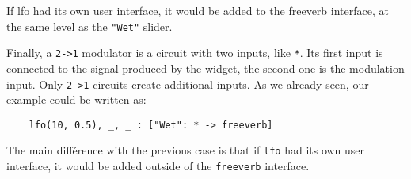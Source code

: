 If lfo had its own user interface, it would be added to the freeverb interface, at the same level as the \lstinline`"Wet"` slider. 

Finally, a \lstinline`2->1` modulator is a circuit with two inputs, like \lstinline`*`. Its first input is connected to the signal produced by the widget, the second one is the modulation input. Only \lstinline`2->1` circuits create additional inputs. As we already seen, our example could be written as:

\begin{lstlisting}
	lfo(10, 0.5), _, _ : ["Wet": * -> freeverb]
\end{lstlisting}
	
The main différence with the previous case is that if \lstinline`lfo` had its own user interface, it would be added outside of the \lstinline`freeverb` interface.
